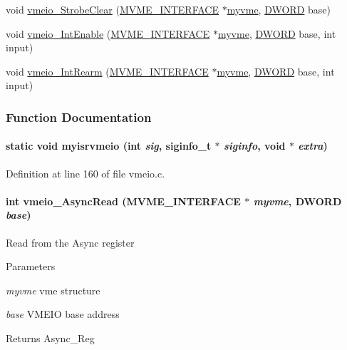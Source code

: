 \begin{DoxyCompactItemize}
\item 
void \hyperlink{vmeio_8c_a43ffc35999b9aebb9948bb7b7dd7e162}{vmeio\_\-StrobeClear} (\hyperlink{structMVME__INTERFACE}{MVME\_\-INTERFACE} $\ast$\hyperlink{fevmemodules_8c_aeab89db2ad759342a32dcd50a0a0156c}{myvme}, \hyperlink{vt2_8h_a798af1e30bc65f319c1a246cecf59e39}{DWORD} base)
\item 
void \hyperlink{vmeio_8c_a435b8c9a42cccfa95a10ae2b6030f416}{vmeio\_\-IntEnable} (\hyperlink{structMVME__INTERFACE}{MVME\_\-INTERFACE} $\ast$\hyperlink{fevmemodules_8c_aeab89db2ad759342a32dcd50a0a0156c}{myvme}, \hyperlink{vt2_8h_a798af1e30bc65f319c1a246cecf59e39}{DWORD} base, int input)
\item 
void \hyperlink{vmeio_8c_a5d16a82b1b6620fc8c2622682c32182b}{vmeio\_\-IntRearm} (\hyperlink{structMVME__INTERFACE}{MVME\_\-INTERFACE} $\ast$\hyperlink{fevmemodules_8c_aeab89db2ad759342a32dcd50a0a0156c}{myvme}, \hyperlink{vt2_8h_a798af1e30bc65f319c1a246cecf59e39}{DWORD} base, int input)
\end{DoxyCompactItemize}


\subsubsection{Function Documentation}
\paragraph[{myisrvmeio}]{\setlength{\rightskip}{0pt plus 5cm}static void myisrvmeio (int {\em sig}, \/  siginfo\_\-t $\ast$ {\em siginfo}, \/  void $\ast$ {\em extra})}\hfill\label{vmeio_8c_a0344e38a36347690a82b4b03dd9b17d0}


Definition at line 160 of file vmeio.c.
\paragraph[{vmeio\_\-AsyncRead}]{\setlength{\rightskip}{0pt plus 5cm}int vmeio\_\-AsyncRead ({\bf MVME\_\-INTERFACE} $\ast$ {\em myvme}, \/  {\bf DWORD} {\em base})}\hfill\label{vmeio_8c_a430d0ca0a0601d0f445fbc4e12f13af5}
Read from the Async register 
\begin{DoxyParams}{Parameters}
\item[{\em myvme}]vme structure \item[{\em base}]VMEIO base address \end{DoxyParams}
\begin{DoxyReturn}{Returns}
Async\_\-Reg 
\end{DoxyReturn}



